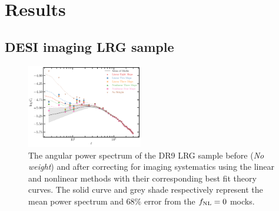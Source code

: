 \section{Results}\label{sec:results}


\subsection{DESI imaging LRG sample}
\begin{figure}
    \centering
    \includegraphics[width=0.45\textwidth]{figures/model_dr9.pdf} 
    \caption{The angular power spectrum of the DR9 LRG sample before (\textit{No weight}) and after correcting for imaging systematics using the linear and nonlinear methods with their corresponding best fit theory curves. The solid curve and grey shade respectively represent the mean power spectrum and $68\%$ error from the $f_{\rm NL}=0$ mocks.}
    \label{fig:cl_dr9}
\end{figure}
